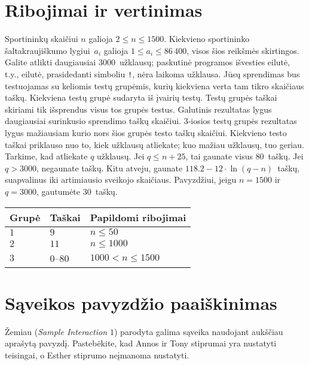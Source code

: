 \section*{Ribojimai ir vertinimas}
Sportininkų skaičiui $n$ galioja
$2\leq n\leq 1500$. %
Kiekvieno sportininko šaltakraujiškumo lygiui~$a_i$ galioja 
$1\leq a_i\leq 86\,400$, %
visos šios reikšmės skirtingos. %
Galite atlikti daugiausiai $3000$~užklausų; %
paskutinė programos išvesties eilutė, t.y., eilutė, prasidedanti simboliu \texttt{!}, nėra laikoma užklausa.
Jūsų sprendimas bus testuojamas su keliomis testų grupėmis, kurių kiekviena verta tam tikro skaičiaus taškų.
Kiekviena testų grupė sudaryta iš įvairių testų.
Testų grupės taškai skiriami tik išsprendus visus tos grupės testus.
Galutinis rezultatas lygus daugiausiai surinkusio sprendimo taškų skaičiui.
$3$-iosios testų grupės rezultatas lygus mažiausiam kurio nors šios grupės testo taškų skaičiui.
Kiekvieno testo taškai priklauso nuo to, kiek užklausų atliekate;
kuo mažiau užklausų, tuo geriau.
Tarkime, kad atliekate $q$ užklausų. 
Jei $q \le n+25$, tai gaunate visus $80$~taškų. 
Jei $q > 3000$, negaunate taškų.
Kitu atveju, gaunate 
$118.2 - 12 \cdot \ln(q - n)$~taškų, suapvalinus iki artimiausio sveikojo skaičiaus. %
Pavyzdžiui, jeigu $n = 1500$ ir $q = 3000$, gautumėte $30$~taškų.
\medskip
\begin{tabular}{lll}
Grupė & Taškai & Papildomi ribojimai\\\hline
$1$  &  $9$ & $n\leq 50$\\
$2$  &  $11$ & $n\leq 1000$\\
$3$  &  $0$--$80$ & $1000 < n\leq 1500$\\
\end{tabular}
\section*{Sąveikos pavyzdžio paaiškinimas}
Žemiau (\emph{Sample Interaction $1$}) parodyta galima sąveika naudojant aukščiau aprašytą pavyzdį.
Pastebėkite, kad Annos ir Tony stiprumai yra nustatyti teisingai, o Esther stiprumo neįmanoma nustatyti.
